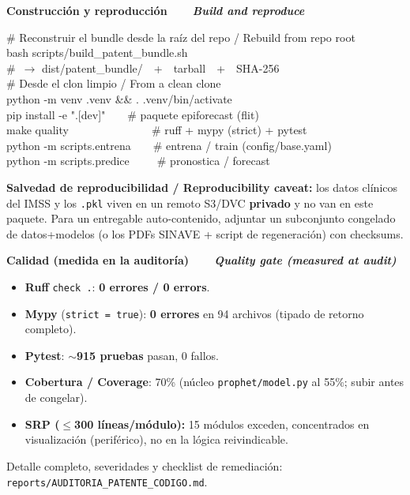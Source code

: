 \documentclass[10pt]{article}
\newcommand{\msec}[2]{\vspace{8pt}\par
  {\hf\bfseries\large\color{indigo}#1\ \ \textcolor{accent}{\textbar}\ \ {\itshape\mdseries\color{soft}#2}}\par
  \vspace{1pt}{\color{accent}\hrule height 1.3pt}\vspace{5pt}}
\newcommand{\codebox}[1]{\par\colorbox{codebg}{\parbox{\dimexpr\linewidth-2\fboxsep\relax}{\ttfamily\small #1}}\par}
\begin{document}
\msec{Construcción y reproducción}{Build and reproduce}
\codebox{\textcolor{soft}{\# Reconstruir el bundle desde la raíz del repo / Rebuild from repo root}\\
bash scripts/build\_patent\_bundle.sh\\
\textcolor{soft}{\#\ $\rightarrow$ dist/patent\_bundle/\ \ +\ \ tarball\ \ +\ \ SHA-256}\\[3pt]
\textcolor{soft}{\# Desde el clon limpio / From a clean clone}\\
python -m venv .venv \&\& . .venv/bin/activate\\
pip install -e ".[dev]"\ \ \ \ \textcolor{soft}{\# paquete epiforecast (flit)}\\
make quality\ \ \ \ \ \ \ \ \ \ \ \ \ \ \ \textcolor{soft}{\# ruff + mypy (strict) + pytest}\\
python -m scripts.entrena\ \ \ \ \textcolor{soft}{\# entrena / train (config/base.yaml)}\\
python -m scripts.predice\ \ \ \ \ \textcolor{soft}{\# pronostica / forecast}}
\vspace{3pt}
{\footnotesize\color{soft}\textbf{Salvedad de reproducibilidad / Reproducibility caveat:} los datos clínicos del IMSS y los \texttt{.pkl} viven en un remoto S3/DVC \textbf{privado} y no van en este paquete. Para un entregable auto-contenido, adjuntar un subconjunto congelado de datos+modelos (o los PDFs SINAVE + script de regeneración) con checksums.}

\msec{Calidad (medida en la auditoría)}{Quality gate (measured at audit)}
\begin{itemize}[leftmargin=14pt,itemsep=1pt,topsep=2pt]
  \item[\textcolor{accent}{\textbullet}] \textbf{Ruff} \texttt{check .}: \textbf{0 errores / 0 errors}.
  \item[\textcolor{accent}{\textbullet}] \textbf{Mypy} (\texttt{strict = true}): \textbf{0 errores} en 94 archivos (tipado de retorno completo).
  \item[\textcolor{accent}{\textbullet}] \textbf{Pytest}: $\sim$\textbf{915 pruebas} pasan, 0 fallos.
  \item[\textcolor{accent}{\textbullet}] \textbf{Cobertura / Coverage}: 70\% (núcleo \texttt{prophet/model.py} al 55\%; subir antes de congelar).
  \item[\textcolor{accent}{\textbullet}] \textbf{SRP ($\leq$300 líneas/módulo):} 15 módulos exceden, concentrados en visualización (periférico), no en la lógica reivindicable.
\end{itemize}
\vspace{2pt}
{\footnotesize\color{soft}Detalle completo, severidades y checklist de remediación: \texttt{reports/AUDITORIA\_PATENTE\_CODIGO.md}.}
\end{document}
